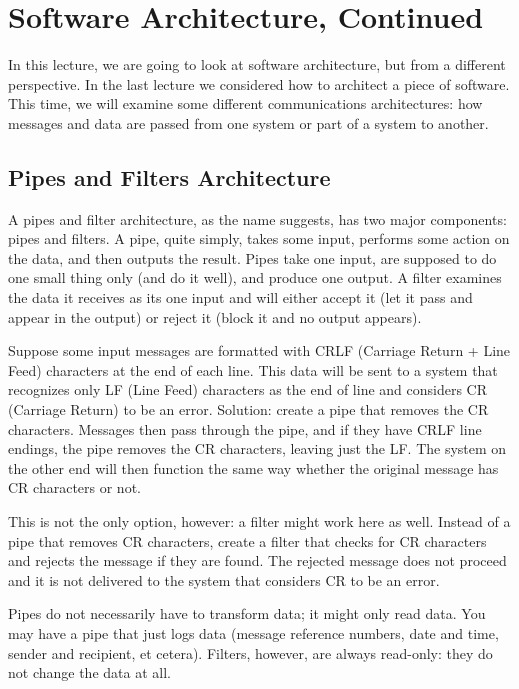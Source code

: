 





\section*{Software Architecture, Continued}
In this lecture, we are going to look at software architecture, but from a different perspective. In the last lecture we considered how to architect a piece of software. This time, we will examine some different communications architectures: how messages and data are passed from one system or part of a system to another.


\subsection*{Pipes and Filters Architecture}
A pipes and filter architecture, as the name suggests, has two major components: pipes and filters. A pipe, quite simply, takes some input, performs some action on the data, and then outputs the result. Pipes take one input, are supposed to do one small thing only (and do it well), and produce one output. A filter examines the data it receives as its one input and will either accept it (let it pass and appear in the output) or reject it (block it and no output appears). 

Suppose some input messages are formatted with CRLF (Carriage Return + Line Feed) characters at the end of each line. This data will be sent to a system that recognizes only LF (Line Feed) characters as the end of line and considers CR (Carriage Return) to be an error. Solution: create a pipe that removes the CR characters. Messages then pass through the pipe, and if they have CRLF line endings, the pipe removes the CR characters, leaving just the LF. The system on the other end will then function the same way whether the original message has CR characters or not.

This is not the only option, however: a filter might work here as well. Instead of a pipe that removes CR characters, create a filter that checks for CR characters and rejects the message if they are found. The rejected message does not proceed and it is not delivered to the system that considers CR to be an error.

Pipes do not necessarily have to transform data; it might only read data. You may have a pipe that just logs data (message reference numbers, date and time, sender and recipient, et cetera). Filters, however, are always read-only: they do not change the data at all.


